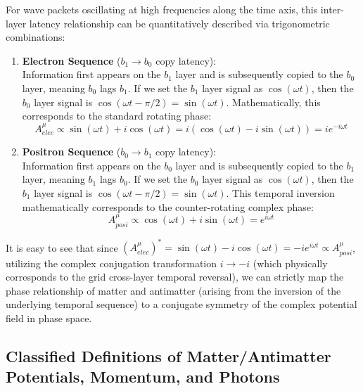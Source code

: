 \documentclass[12pt, a4paper]{article}
\begin{document}
For wave packets oscillating at high frequencies along the time axis, this inter-layer latency relationship can be quantitatively described via trigonometric combinations:
\begin{enumerate}
    \item \textbf{Electron Sequence} ($b_1 \to b_0$ copy latency): \\
    Information first appears on the $b_1$ layer and is subsequently copied to the $b_0$ layer, meaning $b_0$ lags $b_1$. If we set the $b_1$ layer signal as $\cos(\omega t)$, then the $b_0$ layer signal is $\cos(\omega t - \pi/2) = \sin(\omega t)$. Mathematically, this corresponds to the standard rotating phase:
    \begin{equation}
        A^\mu_{elec} \propto \sin(\omega t) + i \cos(\omega t) = i \left( \cos(\omega t) - i \sin(\omega t) \right) = i e^{-i\omega t} 
    \end{equation}
    \item \textbf{Positron Sequence} ($b_0 \to b_1$ copy latency): \\
    Information first appears on the $b_0$ layer and is subsequently copied to the $b_1$ layer, meaning $b_1$ lags $b_0$. If we set the $b_0$ layer signal as $\cos(\omega t)$, then the $b_1$ layer signal is $\cos(\omega t - \pi/2) = \sin(\omega t)$. This temporal inversion mathematically corresponds to the counter-rotating complex phase:
    \begin{equation}
        A^\mu_{posi} \propto \cos(\omega t) + i \sin(\omega t) = e^{i\omega t} 
    \end{equation}
\end{enumerate}

It is easy to see that since $(A^\mu_{elec})^* = \sin(\omega t) - i \cos(\omega t) = -i e^{i\omega t} \propto A^\mu_{posi}$, utilizing the complex conjugation transformation $i \to -i$ (which physically corresponds to the grid cross-layer temporal reversal), we can strictly map the phase relationship of matter and antimatter (arising from the inversion of the underlying temporal sequence) to a conjugate symmetry of the complex potential field in phase space.

\subsection{Classified Definitions of Matter/Antimatter Potentials, Momentum, and Photons}
\end{document}
